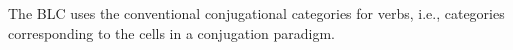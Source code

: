  The BLC uses the conventional conjugational categories for verbs, i.e., categories corresponding to the cells in a conjugation paradigm.


